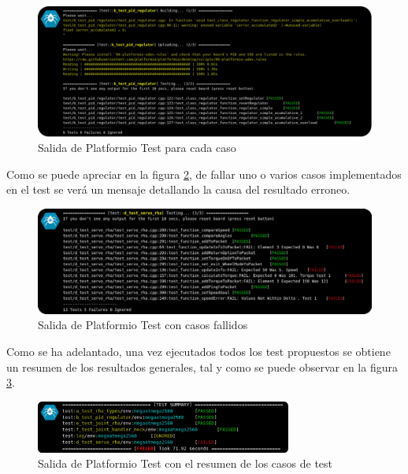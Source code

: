     \begin{figure}[H]
       	\centering
       	\includegraphics[width=1\textwidth]{figuras/Imagenes_SW/test/SWTest_1.jpg}
       	\caption{Salida de Platformio Test para cada caso}
       	\label{fig:SW:test:standard_output}
    \end{figure}

    Como se puede apreciar en la figura \ref{fig:SW:test:error_output}, de fallar uno o varios casos implementados en el test se verá un mensaje detallando la causa del resultado erroneo.

    \begin{figure}[H]
        \centering
        \includegraphics[width=1\textwidth]{figuras/Imagenes_SW/test/SWTest_3.jpg}
        \caption{Salida de Platformio Test con casos fallidos}
        \label{fig:SW:test:error_output}
    \end{figure}

    Como se ha adelantado, una vez ejecutados todos los test propuestos se obtiene un resumen de los resultados generales, tal y como se puede observar en la figura \ref{fig:SW:test:sum_output}.

    \begin{figure}[H]
        \centering
        \includegraphics[width=0.75\textwidth]{figuras/Imagenes_SW/test/SWTest_6.jpg}
        \caption{Salida de Platformio Test con el resumen de los casos de test}
        \label{fig:SW:test:sum_output}
    \end{figure}

